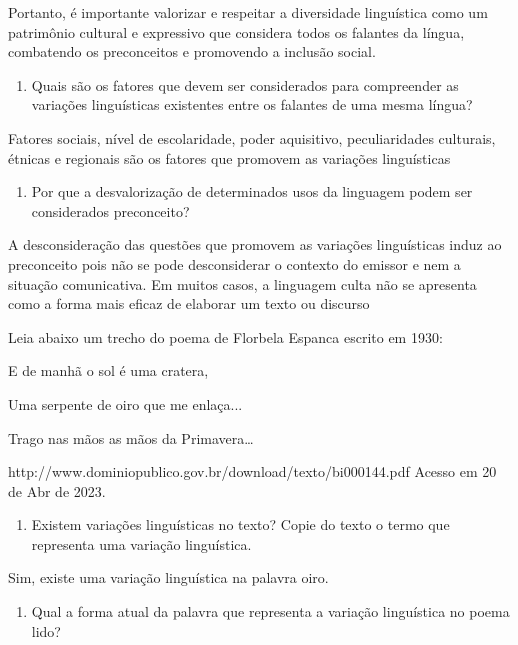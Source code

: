 {\begin{itemize}
\begin{itemize}
{Portanto, é importante valorizar e respeitar a diversidade linguística
como um patrimônio cultural e expressivo que considera todos os falantes
da língua, combatendo os preconceitos e promovendo a inclusão social.}


\begin{enumerate}
\def\labelenumi{\arabic{enumi})}
\tightlist
\item
  Quais são os fatores que devem ser considerados para compreender as
  variações linguísticas existentes entre os falantes de uma mesma
  língua?
\end{enumerate}

Fatores sociais, nível de escolaridade, poder aquisitivo, peculiaridades
culturais, étnicas e regionais são os fatores que promovem as variações
linguísticas

\begin{enumerate}
\def\labelenumi{\arabic{enumi})}
\setcounter{enumi}{1}
\tightlist
\item
  Por que a desvalorização de determinados usos da linguagem podem ser
  considerados preconceito?
\end{enumerate}

A desconsideração das questões que promovem as variações linguísticas
induz ao preconceito pois não se pode desconsiderar o contexto do
emissor e nem a situação comunicativa. Em muitos casos, a linguagem
culta não se apresenta como a forma mais eficaz de elaborar um texto ou
discurso

Leia abaixo um trecho do poema de Florbela Espanca escrito em 1930:

E de manhã o sol é uma cratera,

Uma serpente de oiro que me enlaça...

Trago nas mãos as mãos da Primavera\ldots{}

http://www.dominiopublico.gov.br/download/texto/bi000144.pdf Acesso em
20 de Abr de 2023.

\begin{enumerate}
\def\labelenumi{\arabic{enumi})}
\setcounter{enumi}{2}
\tightlist
\item
  Existem variações linguísticas no texto? Copie do texto o termo que
  representa uma variação linguística.
\end{enumerate}

Sim, existe uma variação linguística na palavra oiro.

\begin{enumerate}
\def\labelenumi{\arabic{enumi})}
\setcounter{enumi}{3}
\tightlist
\item
  Qual a forma atual da palavra que representa a variação linguística no
  poema lido?
\end{enumerate}


\end{itemize}
\end{itemize}}
